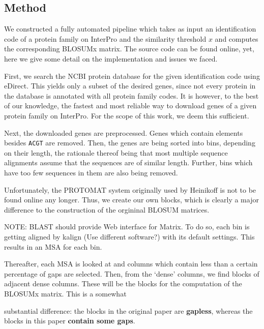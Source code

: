 \documentclass{article}
\begin{document}
\subsection*{Method}
We constructed a fully automated pipeline which takes as input an identification code of a protein
family on InterPro and the similarity threshold $x$ and computes the
corresponding BLOSUMx matrix. The source code can be found online, yet, here we
give some detail on the implementation and issues we faced.

First, we search the NCBI protein database for the given identification code
using eDirect. This yields only a subset of the desired genes, since not every
protein in the database is annotated with all protein family codes. It is
however, to the best of our knowledge, the fastest and most reliable way to
download genes of a given protein family on InterPro. For the scope of this
work, we deem this sufficient.

Next, the downloaded genes are preprocessed. Genes which contain elements
besides \texttt{ACGT} are removed. Then, the genes are being sorted into bins,
depending on their length, the rationale thereof being that most multiple
sequence alignments assume that the sequences are of similar length. Further,
bins which have too few sequences in them are also being removed.

Unfortunately, the PROTOMAT system originally used by Heinikoff is not to be
found online any longer. Thus, we create our own blocks, which is clearly a
major difference to the construction of the orgininal BLOSUM matrices.

NOTE: BLAST should provide Web interface for Matrix.
To do so, each bin is getting aligned by kalign (Use different software?) with
its default settings. This results in an MSA for each bin.

Thereafter, each MSA is looked at and columns which contain less than a certain
percentage of gaps are selected. Then, from the `dense' columns, we find blocks
of adjacent dense columns. These will be the blocks for the computation of the
BLOSUMx matrix. This is a somewhat

substantial difference: the blocks in the original paper are \textbf{gapless},
whereas the blocks in this paper \textbf{contain some gaps}.

\printbibliography
\end{document}
